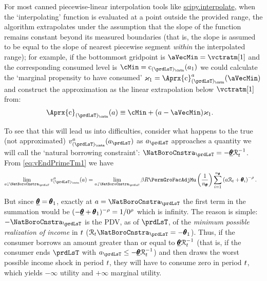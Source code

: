For most canned piecewise-linear interpolation tools like \href{https://docs.scipy.org/doc/scipy/tutorial/interpolate.html}{scipy.interpolate}, when the `interpolating' function is evaluated at a point outside the provided range, the algorithm extrapolates under the assumption that the slope of the function remains constant beyond its measured boundaries (that is, the slope is assumed to be equal to the slope of nearest piecewise segment \emph{within} the interpolated range); for example, if the bottommost gridpoint is $\aVecMin = \vctratm[1]$ and the corresponding consumed level is $\cMin = \cFunc_{({\prdLsT})_\cntn}(a_1)$ we could calculate the `marginal propensity to have consumed' $\varkappa_{1}=
\Aprx{\cFunc}_{({\prdLsT})_\cntn}^{{a}}(\aVecMin)$ and construct the approximation as the linear extrapolation below $\vctratm[1]$ from:
\begin{equation}\begin{gathered}\begin{aligned}
      \Aprx{\cFunc}_{({\prdLsT})_\cntn}({a})  &  \equiv \cMin + ({a}-\aVecMin)\varkappa_{1}  \label{eq:ExtrapLin}.
    \end{aligned}\end{gathered}\end{equation}

To see that this will lead us into difficulties, consider what happens to the true (not approximated) $\vFunc^{{a}}_{({\prdLsT})_\cntn}({a}_{\prdLsT})$ as ${a}_{\prdLsT}$ approaches a quantity we will call the `natural borrowing constraint': $\NatBoroCnstra_{\prdLsT}=-\underline{\TranShkEmp}\RNrm_{\prdT}^{-1}$.  From
\eqref{eq:vEndPrimeTm1} we have
\begin{equation}\begin{gathered}\begin{aligned}
      \lim_{\aNrm \downarrow \NatBoroCnstra_{\prdLsT}} \vFunc^{{a}}_{({\prdLsT})_\cntn}(\aNrm)
      & =                                                                                         \lim_{\aNrm \downarrow \NatBoroCnstra_{\prdLsT}} \DiscFac \Rfree \PermGroFacAdjMu \left(\frac{1}{n_{\TranShkEmp}}\right) \sum_{i=1}^{n_{\TranShkEmp}} \left( \aNrm \RNrm_{\prd}+ \TranShkEmp_{i}\right)^{-\CRRA}.
    \end{aligned}\end{gathered}\end{equation}

But since $\underline{\pmb{\theta}}=\pmb{\theta}_{1}$, exactly at $\aNrm=\NatBoroCnstra_{\prdLsT}$ the first term in the summation would be $(-\underline{\pmb{\theta}}+\pmb{\theta}_{1})^{-\rho}=1/0^{\rho}$ which is infinity.  The reason is simple: $-\NatBoroCnstra_{\prdLsT}$ is the PDV, as of $\prdLsT$, of the \emph{minimum possible realization of income} in $t$ ($\RNrm_{\prdT}\NatBoroCnstra_{\prdLsT} = -\TranShkEmp_{1}$).  Thus, if the consumer borrows an amount greater than or equal to $\underline{\pmb{\theta}}\mathcal{R}_{t}^{-1}$ (that is, if the consumer ends $\prdLsT$ with ${a}_{\prdLsT} \leq -\underline{\TranShkEmp}\RNrm_{\prdT}^{-1}$) and then draws the worst possible income shock in period $t$, they will have to consume zero in period $t$, which yields $-\infty$ utility and $+\infty$ marginal utility.

